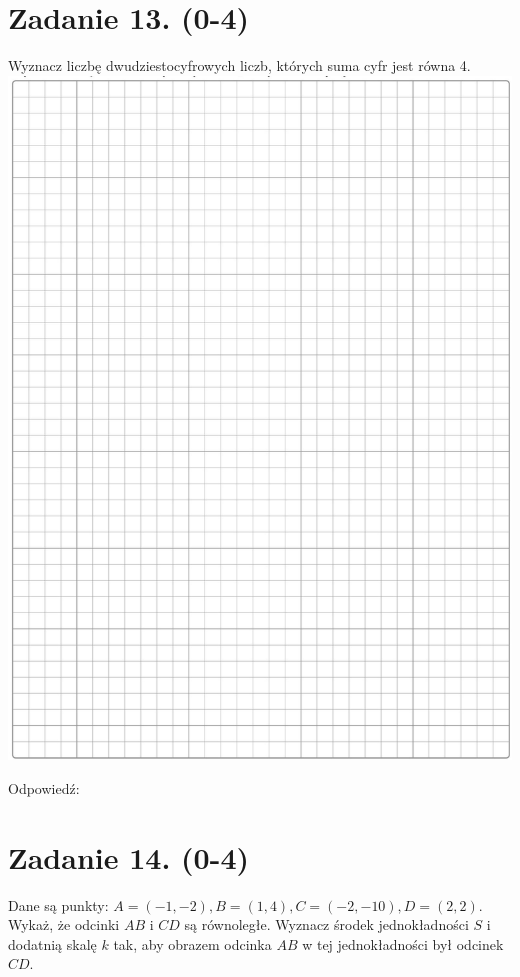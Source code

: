 \documentclass[10pt]{article}
\begin{document}
\section*{Zadanie 13. (0-4)}
Wyznacz liczbę dwudziestocyfrowych liczb, których suma cyfr jest równa 4.\\
\includegraphics[max width=\textwidth, center]{2024_11_21_06df787f12c5337a1fe8g-10}

Odpowiedź:

\section*{Zadanie 14. (0-4)}
Dane są punkty: \(A=(-1,-2), B=(1,4), C=(-2,-10), D=(2,2)\). Wykaż, że odcinki \(A B\) i \(C D\) są równoległe. Wyznacz środek jednokładności \(S\) i dodatnią skalę \(k\) tak, aby obrazem odcinka \(A B\) w tej jednokładności był odcinek \(C D\).
\end{document}
